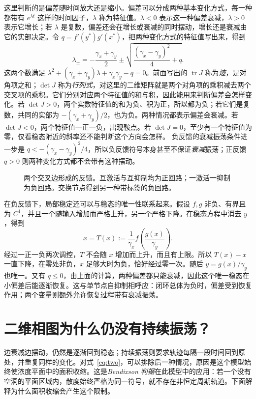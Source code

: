 这里判断的是偏差随时间放大还是缩小。偏差可以分成两种基本变化方式，每一种都带有 $e^{\lambda t}$ 这样的时间因子，$\lambda$ 称为特征值。$\lambda<0$ 表示这一种偏差衰减，$\lambda>0$ 表示它增长；若 $\lambda$ 是复数，偏差还会在增长或衰减的同时摆动，增长还是衰减由它的实部决定。令 $q=f'(y^*)g'(x^*)$，把两种变化方式的特征值写出来，得到
\[
\lambda_{\pm}=-\frac{\gamma_x+\gamma_y}{2}
\pm\sqrt{\frac{(\gamma_x-\gamma_y)^2}{4}+q}.
\]
这两个数满足 $\lambda^2+(\gamma_x+\gamma_y)\lambda+\gamma_x\gamma_y-q=0$。前面写出的 $\operatorname{tr}J$ 称为\emph{迹}，是对角项之和；$\det J$ 称为\emph{行列式}，对这里的二维矩阵就是两个对角项的乘积减去两个交叉项的乘积。它们分别对应两个特征值的和与积，因此能用来判断偏差会怎样变化。若 $\det J>0$，两个实数特征值的和为负、积为正，所以都为负；若它们是复数，共同的实部为 $-(\gamma_x+\gamma_y)/2$，也为负。两种情况都表示偏差会衰减。若 $\det J<0$，两个特征值一正一负，出现鞍点。若 $\det J=0$，至少有一个特征值为零，仅看稳态附近的斜率还不能判断这个方向会怎样。
负反馈的衰减振荡条件进一步是
$q<-(\gamma_x-\gamma_y)^2/4$，所以负反馈符号本身甚至不保证\emph{衰减}振荡；正反馈 $q>0$ 则两种变化方式都不会带有这种摆动。
\begin{figure}[H]\centering
{}
\caption{两个交叉边形成的反馈。互激活与互抑制均为正回路；一激活一抑制为负回路。交换节点得到另一种带标签的负回路。}
\end{figure}

在负反馈下，局部稳定还可以与稳态的唯一性联系起来。假设 $f,g$ 非负、有界且为 $C^1$，并且一个随输入增加而严格上升，另一个严格下降。在稳态方程中消去 $y$，得到
\[
x=T(x):=\frac1{\gamma_x}f\!\left(\frac{g(x)}{\gamma_y}\right).
\]
经过一正一负两次调控，$T$ 不会随 $x$ 增加而上升，而且有上限。所以 $T(x)-x$ 一直下降，在零处非负，$x$ 足够大时为负，恰好经过零一次。随后 $y=g(x)/\gamma_y$ 也唯一。又有 $q\leq0$，由上面的计算，两种偏差都只能衰减，因此这个唯一稳态在小偏差后能逐渐恢复。这与单节点自抑制相呼应：闭环总体为负时，偏差受到恢复作用；两个变量则额外允许恢复过程带有衰减振荡。

\section{二维相图为什么仍没有持续振荡？}
边衰减边摆动，仍然是逐渐回到稳态；持续振荡则要求轨迹每隔一段时间回到原处，并重复同样的变化。对式~\eqref{eq:two}，可以排除后一种情况，原因是这个模型始终使浓度平面中的面积收缩。这是\emph{Bendixson 判据}在此模型中的应用：若一个没有空洞的平面区域内，散度始终严格为同一符号，就不存在非恒定周期轨道。下面解释为什么面积收缩会产生这个限制。

